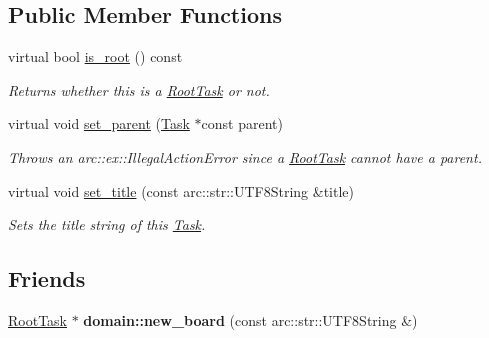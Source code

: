 \subsection*{Public Member Functions}
\begin{DoxyCompactItemize}
\item 
\hypertarget{classsigma_1_1core_1_1tasks_1_1_root_task_a121303d6c4380323fe54bc823ef11514}{}virtual bool \hyperlink{classsigma_1_1core_1_1tasks_1_1_root_task_a121303d6c4380323fe54bc823ef11514}{is\+\_\+root} () const \label{classsigma_1_1core_1_1tasks_1_1_root_task_a121303d6c4380323fe54bc823ef11514}

\begin{DoxyCompactList}\small\item\em Returns whether this is a \hyperlink{classsigma_1_1core_1_1tasks_1_1_root_task}{Root\+Task} or not. \end{DoxyCompactList}\item 
\hypertarget{classsigma_1_1core_1_1tasks_1_1_root_task_a4b9f9c86ba7a0e5b681479a444cd60b1}{}virtual void \hyperlink{classsigma_1_1core_1_1tasks_1_1_root_task_a4b9f9c86ba7a0e5b681479a444cd60b1}{set\+\_\+parent} (\hyperlink{classsigma_1_1core_1_1tasks_1_1_task}{Task} $\ast$const parent)\label{classsigma_1_1core_1_1tasks_1_1_root_task_a4b9f9c86ba7a0e5b681479a444cd60b1}

\begin{DoxyCompactList}\small\item\em Throws an arc\+::ex\+::\+Illegal\+Action\+Error since a \hyperlink{classsigma_1_1core_1_1tasks_1_1_root_task}{Root\+Task} cannot have a parent. \end{DoxyCompactList}\item 
\hypertarget{classsigma_1_1core_1_1tasks_1_1_root_task_a825247badddb1934e51ace7df99503f3}{}virtual void \hyperlink{classsigma_1_1core_1_1tasks_1_1_root_task_a825247badddb1934e51ace7df99503f3}{set\+\_\+title} (const arc\+::str\+::\+U\+T\+F8\+String \&title)\label{classsigma_1_1core_1_1tasks_1_1_root_task_a825247badddb1934e51ace7df99503f3}

\begin{DoxyCompactList}\small\item\em Sets the title string of this \hyperlink{classsigma_1_1core_1_1tasks_1_1_task}{Task}. \end{DoxyCompactList}\end{DoxyCompactItemize}
\subsection*{Friends}
\begin{DoxyCompactItemize}
\item 
\hypertarget{classsigma_1_1core_1_1tasks_1_1_root_task_aa9cd0697dba448e5a3349d45503a9239}{}\hyperlink{classsigma_1_1core_1_1tasks_1_1_root_task}{Root\+Task} $\ast$ {\bfseries domain\+::new\+\_\+board} (const arc\+::str\+::\+U\+T\+F8\+String \&)\label{classsigma_1_1core_1_1tasks_1_1_root_task_aa9cd0697dba448e5a3349d45503a9239}

\end{DoxyCompactItemize}
